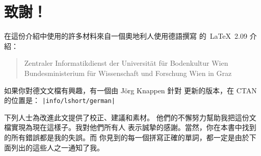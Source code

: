 
\chapter{致謝！}
\noindent 在這份介紹中使用的許多材料來自一個奧地利人使用德語撰寫
的~\LaTeX\ 2.09 介紹：
\begin{verse}
%
{Zentraler Informatikdienst der Universit\"at f\"ur Bodenkultur Wien}
%
   {Bundesministerium f\"ur Wissenschaft und Forschung Wien}
%
   {in Graz}
\end{verse}

如果你對德文文檔有興趣，有一個由 J\"org Knappen 針對 \LaTeXe{} 更新的版本，在 CTAN 的位置是：
\texttt{\CTAN|info/lshort/german|}

\newpage
\noindent 下列人士為改進此文提供了校正、建議和素材。
他們的不懈努力幫助我把這份文檔實現為現在這樣子。我對他們所有人
表示誠摯的感謝。當然，你在本書中找到的所有錯誤都是我的失誤。而
你見到的每一個拼寫正確的單詞，都一定是由於下面列出的這些人之一通知了我。

